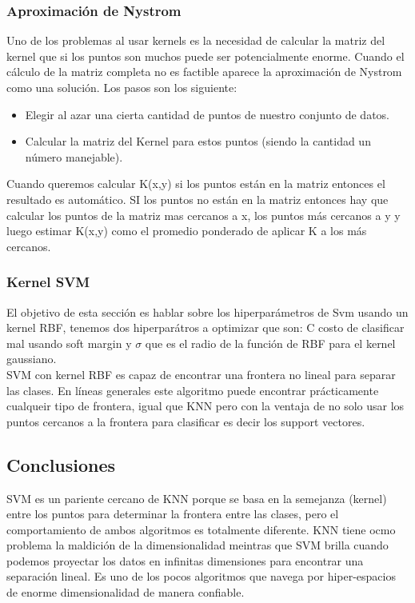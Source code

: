 \documentclass[titlepage,a4paper]{article}
\begin{document}
\subsubsection*{Aproximación de Nystrom}
Uno de los problemas al usar kernels es la necesidad de calcular la matriz del kernel que si los puntos son muchos puede ser potencialmente enorme. Cuando el cálculo de la  matriz completa no es factible aparece la aproximación de Nystrom como una solución. Los pasos son los siguiente: 
\begin{itemize}
\item Elegir al azar una cierta cantidad de puntos de nuestro conjunto de datos. 
\item Calcular la matriz del Kernel para estos puntos (siendo la cantidad un número manejable). 
\end{itemize}

Cuando queremos calcular K(x,y) si los puntos están en la matriz entonces el resultado es automático. SI los puntos no están en la matriz entonces hay que calcular los puntos de la matriz mas cercanos a x, los puntos más cercanos a y y luego estimar K(x,y) como el promedio ponderado de aplicar K a  los más cercanos. 

\subsubsection*{Kernel SVM}
El objetivo de esta sección es hablar sobre los hiperparámetros de Svm usando un kernel RBF, tenemos dos hiperparátros a optimizar que son: C costo de clasificar mal usando soft margin y $\sigma$ que es el radio de la función de RBF para el kernel gaussiano. \\

SVM con kernel RBF es capaz de encontrar una frontera no lineal para separar las clases. En líneas generales este algoritmo puede encontrar prácticamente cualqueir tipo de frontera, igual que KNN pero con la ventaja de no solo usar los puntos cercanos a la frontera para clasificar es decir los support vectores. 


\subsection*{Conclusiones}
SVM es un pariente cercano de KNN porque se basa en la semejanza (kernel) entre los puntos para determinar la frontera entre las clases, pero el comportamiento de ambos algoritmos es totalmente diferente. KNN tiene ocmo problema la maldición de la dimensionalidad meintras que SVM brilla cuando podemos proyectar los datos en infinitas dimensiones para encontrar una separación lineal. Es uno de los pocos  algoritmos que navega por hiper-espacios de enorme dimensionalidad de manera confiable. 
\end{document}
